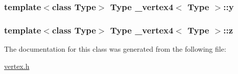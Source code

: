 \hypertarget{class__vertex4_a8adeda89093117902f2d209dc736e7ea}{
\subsubsection[{y}]{\setlength{\rightskip}{0pt plus 5cm}template$<$class Type$>$ Type {\bf \+\_\+vertex4}$<$ Type $>$\+::y}}\label{class__vertex4_a8adeda89093117902f2d209dc736e7ea}
\hypertarget{class__vertex4_afe2944665eb26e649287f8b581c91cc5}{
\subsubsection[{z}]{\setlength{\rightskip}{0pt plus 5cm}template$<$class Type$>$ Type {\bf \+\_\+vertex4}$<$ Type $>$\+::z}}\label{class__vertex4_afe2944665eb26e649287f8b581c91cc5}


The documentation for this class was generated from the following file\+:\begin{DoxyCompactItemize}
\item 
\hyperlink{vertex_8h}{vertex.\+h}\end{DoxyCompactItemize}
